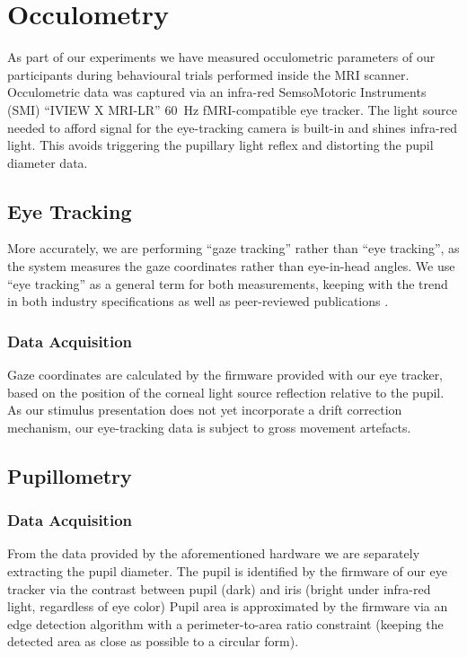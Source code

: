     \section{Occulometry}\label{sec:m_om}
	As part of our experiments we have measured occulometric parameters of our participants during behavioural trials performed inside the MRI scanner.
	Occulometric data was captured via an infra-red SemsoMotoric Instruments (SMI) “IVIEW X\textsuperscript{\small\texttrademark} MRI-LR” \SI{60}{\hertz} fMRI-compatible eye tracker.
	The light source needed to afford signal for the eye-tracking camera is built-in and shines infra-red light.
	This avoids triggering the pupillary light reflex \citep{Ellis1981} and distorting the pupil diameter data.

	\subsection{Eye Tracking}\label{sec:m_om_et}
	    More accurately, we are performing “gaze tracking” rather than “eye tracking”, as the system measures the gaze coordinates rather than eye-in-head angles.
	    We use “eye tracking” as a general term for both measurements, keeping with the trend in both industry specifications \citep{Bojko2006} as well as peer-reviewed publications \citep{Kirk2013}.
	    
	    \subsubsection{Data Acquisition}
		Gaze coordinates are calculated by the firmware provided with our eye tracker, based on the position of the corneal light source reflection relative to the pupil.
		As our stimulus presentation does not yet incorporate a drift correction mechanism, our eye-tracking data is subject to gross movement artefacts.

	\subsection{Pupillometry}\label{sec:m_om_pm}
	    \subsubsection{Data Acquisition}
		From the data provided by the aforementioned hardware we are separately extracting the pupil diameter.
		The pupil is identified by the firmware of our eye tracker via the contrast between pupil (dark) and iris (bright under infra-red light, regardless of eye color)
		Pupil area is approximated by the firmware via an edge detection algorithm with a perimeter-to-area ratio constraint
		(keeping the detected area as close as possible to a circular form).

